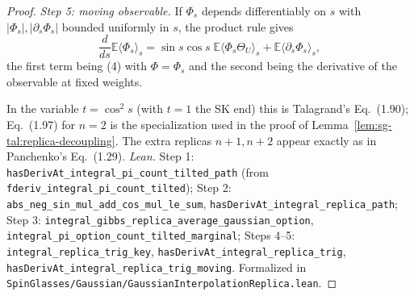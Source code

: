 \begin{proof}
\emph{Step 5: moving observable.} If $\Phi_s$ depends differentiably on $s$ with $|\Phi_s|,|\partial_s\Phi_s|$ bounded uniformly in $s$, the product rule gives
\[
\frac{d}{ds}\mathbb E\langle\Phi_s\rangle_s=\sin s\cos s\;\mathbb E\langle\Phi_s\Theta_U\rangle_s+\mathbb E\langle\partial_s\Phi_s\rangle_s ,
\]
the first term being (4) with $\Phi=\Phi_s$ and the second being the derivative of the observable at fixed weights.

In the variable $t=\cos^2 s$ (with $t=1$ the SK end) this is Talagrand's Eq.~(1.90); Eq.~(1.97) for $n=2$ is the specialization used in the proof of Lemma~\ref{lem:sg-tal:replica-decoupling}. The extra replicas $n+1,n+2$ appear exactly as in Panchenko's Eq.~(1.29).
\emph{Lean.} Step 1: \texttt{hasDerivAt\_integral\_pi\_count\_tilted\_path} (from \texttt{fderiv\_integral\_pi\_count\_tilted}); Step 2: \texttt{abs\_neg\_sin\_mul\_add\_cos\_mul\_le\_sum}, \texttt{hasDerivAt\_integral\_replica\_path}; Step 3: \texttt{integral\_gibbs\_replica\_average\_gaussian\_option}, \texttt{integral\_pi\_option\_count\_tilted\_marginal}; Steps 4--5: \texttt{integral\_replica\_trig\_key}, \texttt{hasDerivAt\_integral\_replica\_trig}, \texttt{hasDerivAt\_integral\_replica\_trig\_moving}. Formalized in \texttt{SpinGlasses/Gaussian/GaussianInterpolationReplica.lean}.
\end{proof}

